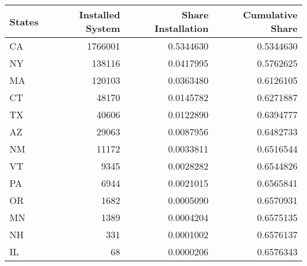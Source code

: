\begin{table}
\centering
\begin{tabular}{l|r|r|r}
\hline
States & Installed System & Share Installation & Cumulative Share\\
\hline
CA & 1766001 & 0.5344630 & 0.5344630\\
\hline
NY & 138116 & 0.0417995 & 0.5762625\\
\hline
MA & 120103 & 0.0363480 & 0.6126105\\
\hline
CT & 48170 & 0.0145782 & 0.6271887\\
\hline
TX & 40606 & 0.0122890 & 0.6394777\\
\hline
AZ & 29063 & 0.0087956 & 0.6482733\\
\hline
NM & 11172 & 0.0033811 & 0.6516544\\
\hline
VT & 9345 & 0.0028282 & 0.6544826\\
\hline
PA & 6944 & 0.0021015 & 0.6565841\\
\hline
OR & 1682 & 0.0005090 & 0.6570931\\
\hline
MN & 1389 & 0.0004204 & 0.6575135\\
\hline
NH & 331 & 0.0001002 & 0.6576137\\
\hline
IL & 68 & 0.0000206 & 0.6576343\\
\hline
\end{tabular}
\end{table}
